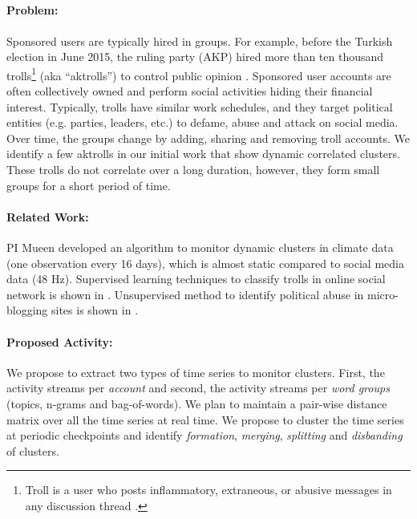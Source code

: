 \subsection{\Tonefour}


\paragraph{Problem:} Sponsored users are typically hired in groups. For example, before the Turkish election in June 2015, the ruling party (AKP) hired more than ten thousand trolls\footnote{Troll is a user who posts inflammatory, extraneous, or abusive messages in any discussion thread \cite{Bishop2012}.} (aka ``aktrolls'') to control public opinion \cite{aktroll}. Sponsored user accounts are often collectively owned and perform social activities hiding their financial interest.
Typically, trolls have similar work schedules, and they target political entities (e.g. parties, leaders, etc.) to defame, abuse and attack on social media. Over time, the groups change by adding, sharing and removing troll accounts. We identify a few aktrolls in our initial work that show dynamic correlated clusters. These trolls do not correlate over a long duration, however, they form small groups for a short period of time. 

\paragraph{Related Work:}

PI Mueen \cite{Mueen:14a} developed an algorithm to monitor dynamic clusters in climate data (one observation every 16 days), which is almost static compared to social media data (48 Hz). Supervised learning techniques to classify trolls in online social network is shown in \cite{Patxi2014}. Unsupervised method to identify political abuse in micro-blogging sites is shown in \cite{Ratkiewicz2011}.




\paragraph{Proposed Activity:}

We propose to extract two types of time series to monitor clusters. First, the activity streams per {\it account} and second, the activity streams per {\it word groups} (topics, n-grams and bag-of-words).
We plan to maintain a pair-wise distance matrix over all the time series at real time. We propose to cluster the time series at periodic checkpoints and identify {\it formation}, {\it merging}, {\it splitting} and {\it disbanding} of clusters.

